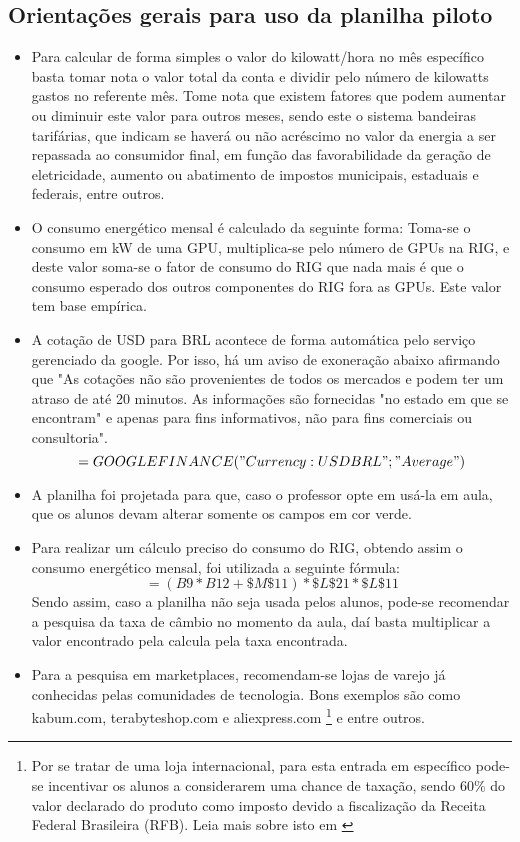 \subsection{Orientações gerais para uso da planilha piloto}
\begin{itemize} 
	\item Para calcular de forma simples o valor do kilowatt/hora no mês específico basta tomar nota o valor total da conta e dividir pelo número de kilowatts gastos no referente mês. Tome nota que existem fatores que podem aumentar ou diminuir este valor para outros meses, sendo este o sistema bandeiras tarifárias, que indicam se haverá ou não acréscimo no valor da energia a ser repassada ao consumidor final, em função das favorabilidade da geração de eletricidade, aumento ou abatimento de impostos municipais, estaduais e federais, entre outros.
	\item O consumo energético mensal é calculado da seguinte forma:
	Toma-se o consumo em kW de uma GPU,  multiplica-se pelo número de GPUs na RIG, e deste valor soma-se o fator de consumo do RIG que nada mais é que o consumo esperado dos outros componentes do RIG fora as GPUs. Este valor tem base empírica.   
	\item {} A cotação de USD para BRL acontece de forma automática pelo serviço gerenciado da google. Por isso, há um aviso de exoneração abaixo afirmando que "As cotações não são provenientes de todos os mercados e podem ter um atraso de até 20 minutos. As informações são fornecidas "no estado em que se encontram" e apenas para fins informativos, não para fins comerciais ou consultoria". 
	\begin{equation}\label{key1}
		=GOOGLEFINANCE("Currency:USDBRL";"Average")
	\end{equation}
	\item A planilha foi projetada para que, caso o professor opte em usá-la em aula, que os alunos devam alterar somente os campos em cor verde.
	\item Para realizar um cálculo preciso do consumo do RIG,  obtendo assim o consumo energético mensal, foi utilizada a seguinte fórmula: 
	\begin{equation}\label{key}
		= (B9*B12+\$M\$11)*\$L\$21*\$L\$11
	\end{equation} 
	Sendo assim, caso a planilha não seja usada pelos alunos, pode-se recomendar a pesquisa da taxa de câmbio no momento da aula, daí basta multiplicar a valor encontrado pela calcula pela taxa encontrada.
	\item {} Para a pesquisa em marketplaces, recomendam-se lojas de varejo já conhecidas pelas comunidades de tecnologia. Bons exemplos são como kabum.com, terabyteshop.com e aliexpress.com \footnote{Por se tratar de uma loja internacional, para esta entrada em específico pode-se incentivar os alunos a considerarem uma chance de taxação, sendo 60\% do valor declarado do produto como imposto devido a fiscalização da Receita Federal Brasileira (RFB). Leia mais sobre isto em \cite{PROMOBIT}} e entre outros.
\end{itemize}





